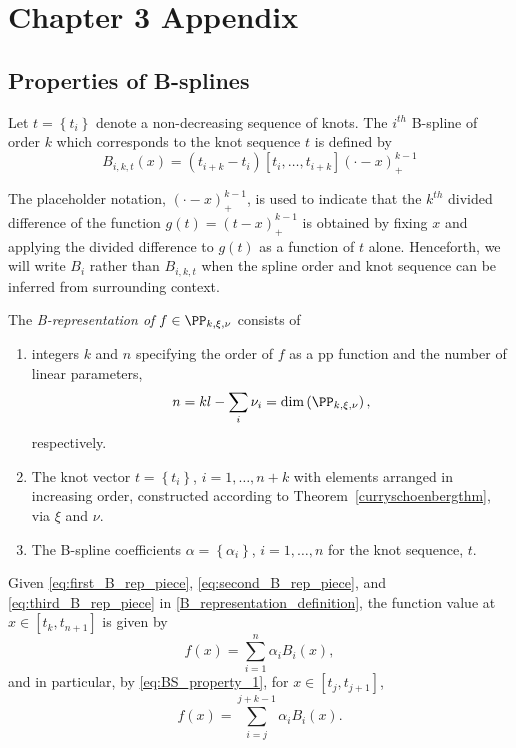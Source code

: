 \chapter{Chapter 3 Appendix} \label{chapter-3-appendix}

\section{Properties of B-splines}

\begin{definition} \label{definition:order_k_Bspline}
Let $t= \left\{ t_i \right\}$ denote a non-decreasing sequence of knots. The $i^{th}$ B-spline of order $k$ which corresponds to the knot sequence $t$ is defined by 
\begin{equation} \label{eq:bspline_definition}
B_{i,k,t}\left(x\right) = \left(t_{i+k}-t_i\right)\left[t_i,\dots,t_{i+k}\right]\left(\cdot -x\right)_+^{k-1}
\end{equation}
\end{definition}

The placeholder notation, $\left(\cdot - x\right)_+^{k-1}$, is used to indicate that the $k^{th}$ divided difference of the function $g\left(t \right) = \left(t-x\right)^{k-1}_+$ is obtained by fixing $x$ and applying the divided difference to $g\left(t \right)$ as a function of $t$ alone. Henceforth, we will write $B_i$ rather than $B_{i,k,t}$ when the spline order and knot sequence can be inferred from surrounding context.


\begin{definition} \label{B_representation_definition}
The \emph{B-representation of } $f \in \PP_{k,\xi,\nu}$ consists of 
\begin{enumerate}
\item \label{eq:first_B_rep_piece} integers $k$ and $n$ specifying the order of $f$ as a pp function and the number of linear parameters, 
\[
n = kl - \sum_{i}\nu_i = \mbox{dim}\left(\PP_{k,\xi,\nu}\right),
\]
respectively. 
\item \label{eq:second_B_rep_piece}The knot vector $t = \left \{t_i \right\}$, $i=1,\dots, n+k$ with elements arranged in increasing order, constructed according to Theorem~\ref{curryschoenbergthm}, via $\xi$ and $\nu$.
\item \label{eq:third_B_rep_piece} The B-spline coefficients $\alpha=\left \{\alpha_i \right\}$, $i=1 ,\dots, n$ for the knot sequence, $t$.
\end{enumerate}
\end{definition}
\vspace{1pt}
Given \ref{eq:first_B_rep_piece}, \ref{eq:second_B_rep_piece}, and \ref{eq:third_B_rep_piece} in \ref{B_representation_definition}, the function value at $x\in \left[t_k, t_{n+1}\right]$ is given by 
\begin{equation*}
f\left(x\right) = \sum_{i=1}^n \alpha_i B_i\left(x\right),
\end{equation*}
and in particular, by \ref{eq:BS_property_1}, for $x\in \left[t_j, t_{j+1} \right]$,
\[
f\left(x\right) = \sum_{i=j}^{j+k-1} \alpha_i B_i\left(x\right).
\]



